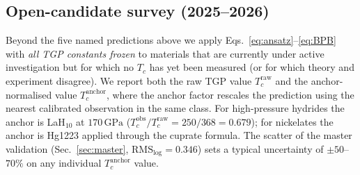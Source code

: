 \documentclass[11pt,a4paper]{article}
\newcommand{\GPa}{\,\mathrm{GPa}}
\begin{document}
\subsection{Open-candidate survey (2025--2026)}\label{sec:open-candidates}

Beyond the five named predictions above we apply
Eqs.~\eqref{eq:ansatz}--\eqref{eq:BPB} with \emph{all TGP constants frozen}
to materials that are currently under active investigation but for which
no $T_{c}$ has yet been measured (or for which theory and experiment
disagree).  We report both the raw TGP value $T_{c}^{\mathrm{raw}}$ and
the anchor-normalised value $T_{c}^{\mathrm{anchor}}$, where the anchor
factor rescales the prediction using the nearest calibrated observation
in the same class.  For high-pressure hydrides the anchor is
LaH$_{10}$ at $170\GPa$ ($T_{c}^{\mathrm{obs}}/T_{c}^{\mathrm{raw}}=250/368
=0.679$); for nickelates the anchor is Hg1223 applied through the
cuprate formula.  The scatter of the master validation
(Sec.~\ref{sec:master}, $\mathrm{RMS}_{\log}=0.346$) sets a typical
uncertainty of $\pm 50$--$70\%$ on any individual $T_{c}^{\mathrm{anchor}}$
value.
\end{document}
